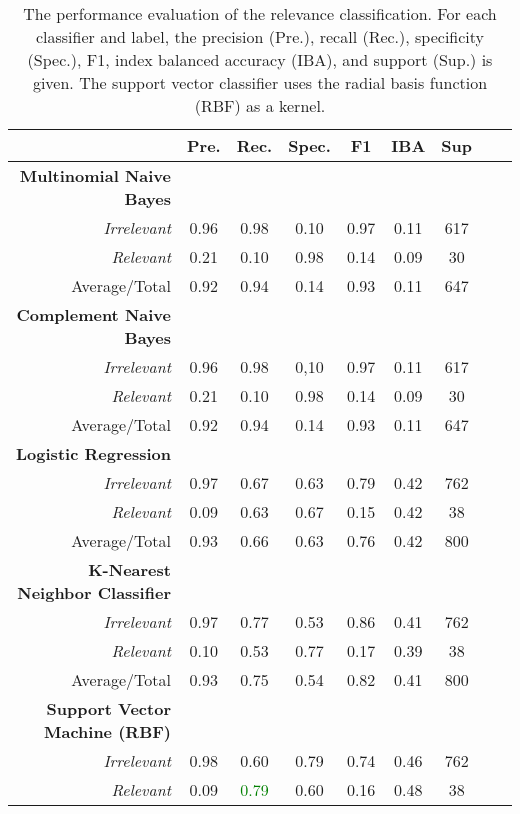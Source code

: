 \begin{table}
  \caption{The performance evaluation of the relevance classification. For each classifier and label, the precision (Pre.), recall (Rec.), specificity (Spec.), F1, index balanced accuracy (IBA), and support (Sup.) is given. The support vector classifier uses the radial basis function (RBF) as a kernel.}
  \centering
  \begin{tabular}{@{}rcccccccc@{}}
    \toprule
     & \textbf{Pre.} & \textbf{Rec.} & \textbf{Spec.}
    & \textbf{F1} &  \textbf{IBA}& \textbf{Sup} \\
    \midrule
    \textbf{Multinomial Naive Bayes}\\
    \emph{Irrelevant}& 0.96& 0.98&  0.10& 0.97& 0.11& 617 \\
    \emph{Relevant}& 0.21& 0.10&  0.98& 0.14& 0.09& 30 \\
    Average/Total& 0.92& 0.94& 0.14& 0.93& 0.11& 647 \vspace{2mm}\\
    \textbf{Complement Naive Bayes}\\
    \emph{Irrelevant}& 0.96& 0.98&  0,10& 0.97& 0.11& 617 \\
    \emph{Relevant}& 0.21& 0.10&  0.98& 0.14& 0.09& 30 \\
    Average/Total& 0.92& 0.94& 0.14& 0.93& 0.11& 647 \vspace{2mm}\\
    \textbf{Logistic Regression}\\
    \emph{Irrelevant}& 0.97& 0.67&  0.63& 0.79& 0.42& 762 \\
    \emph{Relevant}& 0.09& 0.63&  0.67& 0.15& 0.42& 38 \\
    Average/Total& 0.93& 0.66& 0.63& 0.76& 0.42& 800 \vspace{2mm}\\
    \textbf{K-Nearest Neighbor Classifier}\\
    \emph{Irrelevant}& 0.97& 0.77&  0.53& 0.86& 0.41& 762 \\
    \emph{Relevant}& 0.10& 0.53&  0.77& 0.17& 0.39& 38 \\
    Average/Total& 0.93& 0.75& 0.54& 0.82& 0.41& 800 \vspace{2mm}\\
    \textbf{Support Vector Machine (RBF)}\\
    \emph{Irrelevant}& 0.98& 0.60&  0.79& 0.74& 0.46& 762 \\
    \emph{Relevant}& 0.09& \textcolor{green}{0.79}&  0.60& 0.16& 0.48& 38 \\

\end{tabular}
\end{table}
